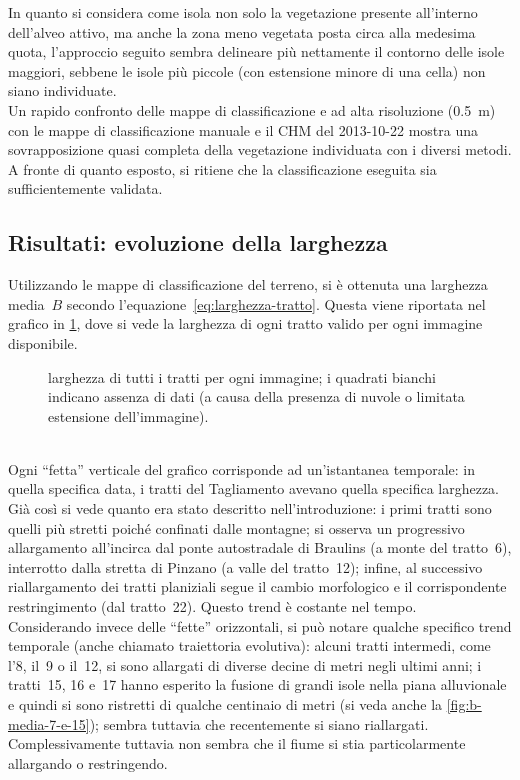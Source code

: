 \begin{description}
	In quanto si considera come isola non solo la vegetazione presente all'interno dell'alveo attivo, ma anche la zona meno vegetata posta circa alla medesima quota, l'approccio seguito sembra delineare più nettamente il contorno delle isole maggiori, sebbene le isole più piccole (con estensione minore di una cella) non siano individuate.
	\\
	Un rapido confronto delle mappe di classificazione \Pl{} e \WV{} ad alta risoluzione (\SI{0.5}{\m}) con le mappe di classificazione manuale e il CHM del 2013-10-22 mostra una sovrapposizione quasi completa della vegetazione individuata con i diversi metodi.
	\\
	A fronte di quanto esposto, si ritiene che la classificazione eseguita sia sufficientemente validata.
\end{description}



\FloatBarrier
\subsection{Risultati: evoluzione della larghezza}
Utilizzando le mappe di classificazione del terreno, si è ottenuta una larghezza media~$B$ secondo l'equazione~\eqref{eq:larghezza-tratto}. Questa viene riportata nel grafico in \cref{graph:larghezze-tutti-tratti}, dove si vede la larghezza di ogni tratto valido per ogni immagine disponibile.
%
\begin{figure}
	\centering
	
	\caption[larghezza di tutti i tratti per ogni immagine]{larghezza di tutti i tratti per ogni immagine; i quadrati bianchi indicano assenza di dati (a causa della presenza di nuvole o limitata estensione dell'immagine).}
	\label{graph:larghezze-tutti-tratti}
\end{figure}
%
\\
Ogni “fetta” verticale del grafico corrisponde ad un'istantanea temporale: in quella specifica data, i tratti del Tagliamento avevano quella specifica larghezza.
Già così si vede quanto era stato descritto nell'introduzione:
i primi tratti sono quelli più stretti poiché confinati dalle montagne;
si osserva un progressivo allargamento all'incirca dal ponte autostradale di Braulins (a monte del tratto~6), interrotto dalla stretta di Pinzano (a valle del tratto~12);
infine, al successivo riallargamento dei tratti planiziali segue il cambio morfologico e il corrispondente restringimento (dal tratto~22).
Questo trend è costante nel tempo.
\\
Considerando invece delle “fette” orizzontali, si può notare qualche specifico trend temporale (anche chiamato traiettoria evolutiva):
alcuni tratti intermedi, come l'8, il~9 o il~12, si sono allargati di diverse decine di metri negli ultimi anni;
i tratti~15, 16 e~17 hanno esperito la fusione di grandi isole nella piana alluvionale e quindi si sono ristretti di qualche centinaio di metri (si veda anche la \cref{fig:b-media-7-e-15}); sembra tuttavia che recentemente si siano riallargati.
Complessivamente tuttavia non sembra che il fiume si stia particolarmente allargando o restringendo.


